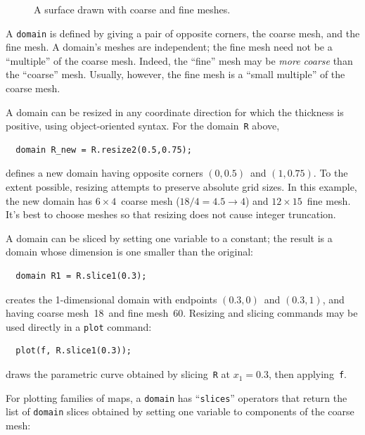 \documentclass[12pt]{report}
\newcommand{\code}[1]{\texttt{#1}}
\begin{document}
\begin{figure}[hbt]
  \begin{center}
    \hspace*{0.5in}
    
    \caption{A surface drawn with coarse and fine meshes.}
    \label{fig:plot}
  \end{center}
\end{figure}


A \code{domain} is defined by giving a pair of opposite corners, the
coarse mesh, and the fine mesh. A domain's meshes are independent; the
fine mesh need not be a ``multiple'' of the coarse mesh.  Indeed, the
``fine'' mesh may be \emph{more coarse} than the ``coarse'' mesh.
Usually, however, the fine mesh is a ``small multiple'' of the coarse
mesh.

A domain can be resized in any coordinate direction for which the
thickness is positive, using object-oriented syntax. For the
domain~\code{R} above,
\begin{verbatim}
  domain R_new = R.resize2(0.5,0.75);
\end{verbatim}
defines a new domain having opposite corners $(0,0.5)$~and $(1,0.75)$.
To the extent possible, resizing attempts to preserve absolute grid
sizes. In this example, the new domain has $6\times4$~coarse mesh
($18/4=4.5\to4$) and $12\times15$~fine mesh.  It's best to choose
meshes so that resizing does not cause integer truncation.

A domain can be sliced by setting one variable to a constant; the
result is a domain whose dimension is one smaller than the original:
\begin{verbatim}
  domain R1 = R.slice1(0.3);
\end{verbatim}
creates the 1-dimensional domain with endpoints $(0.3,0)$~and
$(0.3,1)$, and having coarse mesh~18~and fine mesh~60.  Resizing and
slicing commands may be used directly in a \code{plot} command:
\begin{verbatim}
  plot(f, R.slice1(0.3));
\end{verbatim}
draws the parametric curve obtained by slicing~\code{R} at $x_1=0.3$,
then applying~\code{f}. 

For plotting families of maps, a \code{domain} has ``\code{slices}''
operators that return the list of \code{domain} slices obtained by
setting one variable to components of the coarse mesh:
\begin{center}
  
\end{center}
\end{document}
